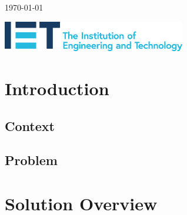 \documentclass[11pt]{article}
\begin{document}
\begin{titlepage}
    \vfill\vfill\vfill %
    
    {\large\today} %
    
    
    \vfill
    \includegraphics[width=0.6\textwidth]{../../assets/IET_Logo_Blue_RGB.png}\\
     
    
    \vfill %
    
\end{titlepage}


\tableofcontents

\bigskip

\listoffigures

\newpage


\setcounter{page}{1}

\section{Introduction}

\subsection{Context}



\subsection{Problem}


\newpage

\section{Solution Overview}
\end{document}
